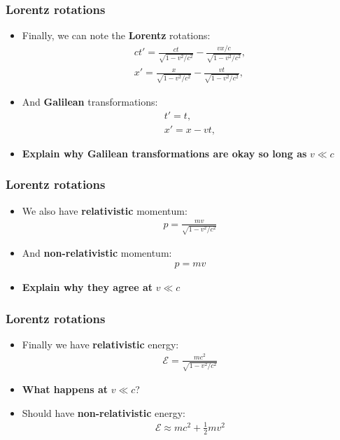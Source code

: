 \documentclass{beamer}
\begin{document}
\begin{frame}
  \frametitle{Lorentz rotations}
  \begin{itemize}
    \item<1-> Finally, we can note the \textbf{Lorentz} rotations:
      \begin{gather*}
	ct'=\frac{ct}{\sqrt{1-v^2/c^2}}-\frac{vx/c}{\sqrt{1-v^2/c^2}},\\
	x'=\frac{x}{\sqrt{1-v^2/c^2}}-\frac{vt}{\sqrt{1-v^2/c^2}},
      \end{gather*}
    \item<2-> And \textbf{Galilean} transformations:
      \begin{gather*}
	t'=t,\\
	x'=x-vt,
      \end{gather*}
    \item<3-> \textbf{Explain why Galilean transformations are okay so long as} $v\ll c$
  \end{itemize}
\end{frame}

\begin{frame}
  \frametitle{Lorentz rotations}
  \begin{itemize}
    \item<1-> We also have \textbf{relativistic} momentum:
      \begin{gather*}
	p=\frac{mv}{\sqrt{1-v^2/c^2}}
      \end{gather*}
    \item<2-> And \textbf{non-relativistic} momentum:
      \begin{gather*}
	p=mv
      \end{gather*}
    \item<3-> \textbf{Explain why they agree at} $v\ll c$
  \end{itemize}
\end{frame}

\begin{frame}
  \frametitle{Lorentz rotations}
  \begin{itemize}
    \item<1-> Finally we have \textbf{relativistic} energy:
      \begin{gather*}
	\mathcal{  E}=\frac{mc^2}{\sqrt{1-v^2/c^2}}
      \end{gather*}
    \item<2-> \textbf{What happens at} $v\ll c$?
    \item<3-> Should have \textbf{non-relativistic} energy:
      \begin{gather*}
	\mathcal{  E}\approx mc^2+\frac{1}{2}mv^2
      \end{gather*}
  \end{itemize}
\end{frame}
\end{document}
